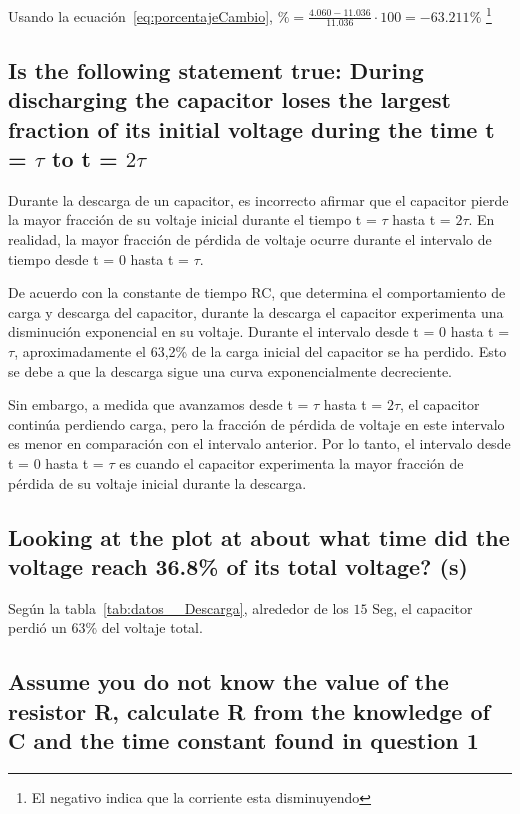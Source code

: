 \documentclass[twocolumn, 12pt]{article}
\begin{document}
Usando la ecuación~\eqref{eq:porcentajeCambio}, $\% =
    \frac{4.060 - 11.036}{11.036} \cdot 100 = -63.211\%$
\footnote{El negativo indica que la corriente esta
    disminuyendo}

\subsection{Is the following statement true: During discharging the capacitor loses the largest
    fraction of its initial voltage during the time t = $\tau$ to t = $2\tau$}

Durante la descarga de un capacitor, es incorrecto afirmar
que el capacitor pierde la mayor fracción de su voltaje
inicial durante el tiempo t = $\tau$ hasta t = $2\tau$. En
realidad, la mayor fracción de pérdida de voltaje ocurre
durante el intervalo de tiempo desde t = $0$ hasta t =
$\tau$.

De acuerdo con la constante de tiempo RC, que determina el
comportamiento de carga y descarga del capacitor, durante
la descarga el capacitor experimenta una disminución
exponencial en su voltaje. Durante el intervalo desde t = 0
hasta t = $\tau$, aproximadamente el 63,2\% de la carga
inicial del capacitor se ha perdido. Esto se debe a que la
descarga sigue una curva exponencialmente decreciente.

Sin embargo, a medida que avanzamos desde t = $\tau$ hasta
t = $2\tau$, el capacitor continúa perdiendo carga, pero la
fracción de pérdida de voltaje en este intervalo es menor
en comparación con el intervalo anterior. Por lo tanto, el
intervalo desde t = 0 hasta t = $\tau$ es cuando el
capacitor experimenta la mayor fracción de pérdida de su
voltaje inicial durante la descarga.

\subsection{Looking at the plot at about what time did the voltage reach 36.8\% of its total voltage?
    (s)}

Según la tabla~\ref{tab:datos__Descarga}, alrededor de los
$15$ Seg, el capacitor perdió un $63\%$ del voltaje total.

\subsection{Assume you do not know the value of the resistor R, calculate R from the knowledge of
    C and the time constant found in question 1}
\end{document}
